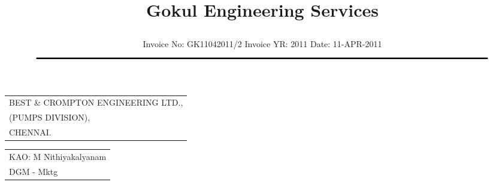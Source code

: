 \documentclass[11pt]{article}
\title{\vspace*{1cm} \centerline{ \Huge { \bf \hspace{0cm} Gokul Engineering Services}\vspace*{-0.5cm}}}
\author{%
 \scriptsize Invoice No: GK11042011/2  \hspace*{4cm}  Invoice YR: 2011 \hspace*{4cm} Date:  11-APR-2011\\
$\rule{7.5in}{0.5mm}$}
\date{}
\begin{document}
\maketitle
\thispagestyle{empty}
\vspace*{0cm}	
\begin{flushleft}
{\footnotesize{
\begin{tabular}{l}
BEST \& CROMPTON ENGINEERING LTD.,\\
(PUMPS DIVISION),\\
CHENNAI.\\
\end{tabular}
}}
\end{flushleft}

\vspace*{-1cm}
\vspace*{-20pt}

\begin{flushright}
\begin{tabular}{l}
 KAO: M Nithiyakalyanam \\
 DGM - Mktg
\end{tabular}
\end{flushright}
\vspace{1cm}

\end{document}
